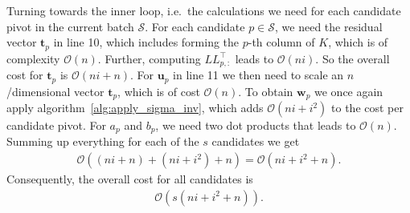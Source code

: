 \documentclass[onefignum,onetabnum]{siamart250211}
\begin{document}
Turning towards the inner loop, i.e.~the calculations we need for each candidate pivot in the current batch $\mathcal{S}$. For each candidate $p \in \mathcal{S}$, we need the residual vector $\bm{t}_p$ in line 10, which includes forming the $p$-th column of $K$, which is of complexity $\mathcal{O}(n)$. Further, computing $LL_{p,:}^\top$ leads to $\mathcal{O}(ni)$. So the overall cost for $\bm{t}_p$ is $\mathcal{O}(ni+n)$. For $\bm{u}_p$ in line 11 we then need to scale an $n$/dimensional vector $\bm{t}_p$, which is of cost $\mathcal{O}(n)$. To obtain $\bm{w}_p$ we once again apply algorithm~\ref{alg:apply_sigma_inv}, which adds $\mathcal{O}(ni +i^2)$ to the cost per candidate pivot. For $a_p$ and $b_p$, we need two dot products that leads to $\mathcal{O}(n)$. Summing up everything for each of the $s$ candidates we get 
\begin{align*}
    \mathcal{O}((ni+n) + (ni + i^2) + n) = \mathcal{O}(ni + i^2 +n).
\end{align*}
Consequently, the overall cost for all candidates is
\begin{align*}
    \mathcal{O}(s(ni+i^2 + n)).
\end{align*}
\end{document}
